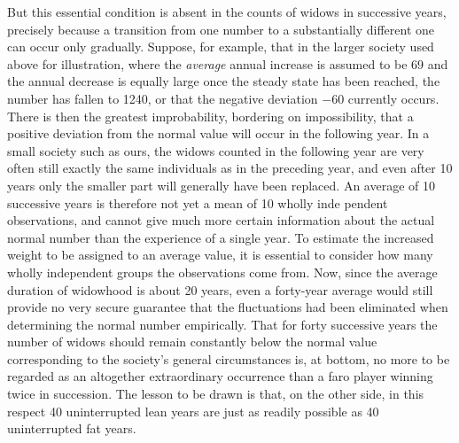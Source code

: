 But this essential condition is absent in the counts of widows in successive years, precisely because a transition from one number to a substantially different one can occur only gradually. Suppose, for example, that in the larger society used above for illustration, where the \textit{average} annual increase is assumed to be 69 and the annual decrease is equally large once the steady state has been reached, the number has fallen to 1240, or that the negative deviation \(-60\) currently occurs. There is then the greatest improbability, bordering on impossibility, that a positive deviation from the normal value will occur in the following year. In a small society such as ours, the widows counted in the following year are very often still exactly the same individuals as in the preceding year, and even after 10 years only the smaller part will generally have been replaced. An average of 10 successive years is therefore not yet a mean of 10 wholly inde%
%
pendent observations, and cannot give much more certain information about the actual normal number than the experience of a single year. To estimate the increased weight to be assigned to an average value, it is essential to consider how many wholly independent groups the observations come from. Now, since the average duration of widowhood is about 20 years, even a forty-year average would still provide no very secure guarantee that the fluctuations had been eliminated when determining the normal number empirically. That for forty successive years the number of widows should remain constantly below the normal value corresponding to the society's general circumstances is, at bottom, no more to be regarded as an altogether extraordinary occurrence than a faro player winning twice in succession. The lesson to be drawn is that, on the other side, in this respect 40 uninterrupted lean years are just as readily possible as 40 uninterrupted fat years.

